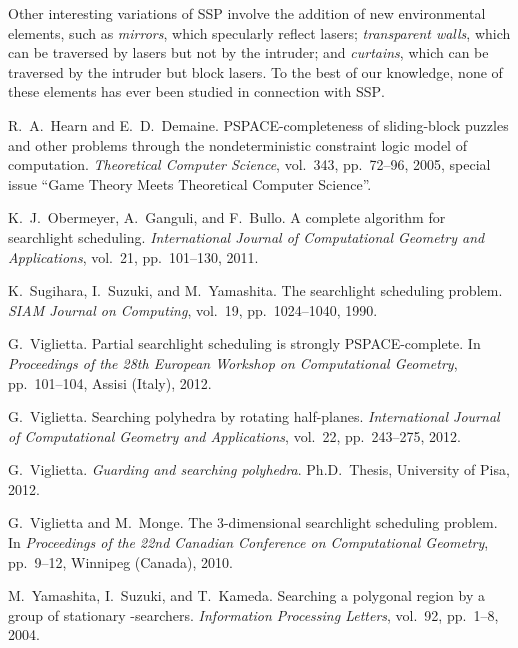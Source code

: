 \documentclass{style}
\newcommand{\computproblem}[1]{\textsc{#1}}
\newcommand{\SSP}{\computproblem{SSP}\xspace}
\begin{document}
Other interesting variations of \SSP involve the addition of new environmental elements, such as \emph{mirrors}, which specularly reflect lasers; \emph{transparent walls}, which can be traversed by lasers but not by the intruder; and \emph{curtains}, which can be traversed by the intruder but block lasers. To the best of our knowledge, none of these elements has ever been studied in connection with \SSP.

\small


\begin{thebibliography}{9}

R.~A.~Hearn and E.~D.~Demaine.
PSPACE-completeness of sliding-block puzzles and other problems through the nondeterministic constraint logic model of computation.
{\it Theoretical Computer Science}, vol.~343, pp.~72--96, 2005, special issue ``Game Theory Meets Theoretical Computer Science''.

K.~J.~Obermeyer, A.~Ganguli, and F.~Bullo.
A complete algorithm for searchlight scheduling.
{\it International Journal of Computational Geometry and Applications}, vol.~21, pp.~101--130, 2011.

K.~Sugihara, I.~Suzuki, and M.~Yamashita.
The searchlight scheduling problem.
{\it SIAM Journal on Computing}, vol.~19, pp.~1024--1040, 1990.

G.~Viglietta.
Partial searchlight scheduling is strongly PSPACE-complete.
In {\it Proceedings of the 28th European Workshop on Computational Geometry}, pp.~101--104, Assisi (Italy), 2012.

G.~Viglietta.
Searching polyhedra by rotating half-planes.
{\it International Journal of Computational Geometry and Applications}, vol.~22, pp.~243--275, 2012.

G.~Viglietta.
{\it Guarding and searching polyhedra}.
Ph.D.~Thesis, University of Pisa, 2012.

G.~Viglietta and M.~Monge.
The 3-dimensional searchlight scheduling problem.
In {\it Proceedings of the 22nd Canadian Conference on Computational Geometry}, pp.~9--12, Winnipeg (Canada), 2010.

M.~Yamashita, I.~Suzuki, and T.~Kameda.
Searching a polygonal region by a group of stationary -searchers.
{\it Information Processing Letters}, vol.~92, pp.~1--8, 2004.

\end{thebibliography}
\end{document}
